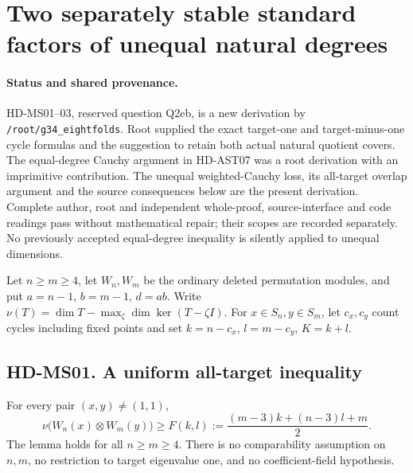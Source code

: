 \section{Two separately stable standard factors of unequal natural degrees}
\label{sec:unequal-standard-partners}

\paragraph{Status and shared provenance.}
HD-MS01--03, reserved question Q2eb, is a new derivation by
\texttt{/root/g34\_eightfolds}. Root supplied the exact target-one and
target-minus-one cycle formulas and the suggestion to retain both actual
natural quotient covers. The equal-degree Cauchy argument in HD-AST07
was a root derivation with an imprimitive contribution. The unequal
weighted-Cauchy loss, its all-target overlap argument and the source
consequences below are the present derivation. Complete author, root
and independent whole-proof, source-interface and code readings pass
without mathematical repair; their scopes are recorded separately. No previously accepted
equal-degree inequality is silently applied to unequal dimensions.

Let $n\ge m\ge4$, let $W_n,W_m$ be the ordinary deleted permutation
modules, and put $a=n-1$, $b=m-1$, $d=ab$. Write
$\nu(T)=\dim T-\max_\zeta\dim\ker(T-\zeta I)$.
For $x\in S_n,y\in S_m$, let $c_x,c_y$ count cycles including fixed
points and set $k=n-c_x$, $l=m-c_y$, $K=k+l$.

\subsection*{HD-MS01. A uniform all-target inequality}

\begin{lemma}[HD-MS01]
For every pair $(x,y)\ne(1,1)$,
\[
 \nu\bigl(W_n(x)\otimes W_m(y)\bigr)
 \ge F(k,l):=\frac{(m-3)k+(n-3)l+m}{2}.
 \tag{MS.1}
\]
The lemma holds for all $n\ge m\ge4$. There is no comparability
assumption on $n,m$, no restriction to target eigenvalue one, and
no coefficient-field hypothesis.
\end{lemma}

